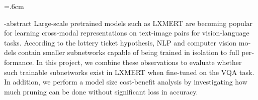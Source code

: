 
\baselineskip=.6cm
\begin{latin}

\en-abstract{
Large-scale pretrained models such as LXMERT are becoming popular for learning cross-modal representations on text-image pairs for vision-language tasks. According to the lottery ticket hypothesis, NLP and computer vision models contain smaller subnetworks capable of being trained in isolation to full performance. In this project, we combine these observations to evaluate whether such trainable subnetworks exist in LXMERT when fine-tuned on the VQA task. In addition, we perform a model size cost-benefit analysis by investigating how much pruning can be done without significant loss in accuracy.
}
\latinfirstPage
\end{latin}
